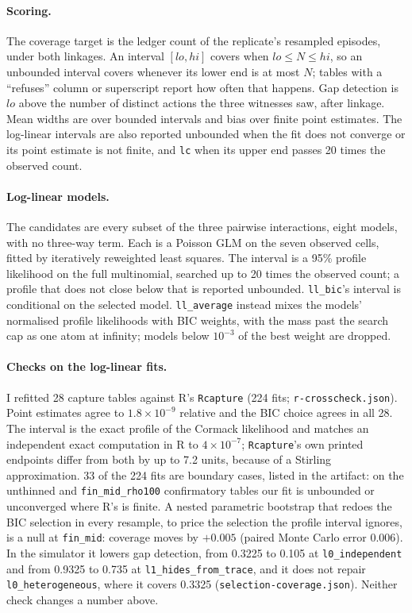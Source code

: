\documentclass[11pt]{article}
\begin{document}
\paragraph{Scoring.} The coverage target is the ledger count of the
replicate's resampled episodes, under both linkages. An interval $[lo, hi]$
covers when $lo \le N \le hi$, so an unbounded interval covers whenever its lower
end is at most $N$; tables with a ``refuses'' column or superscript report how
often that happens. Gap detection is
$lo$ above the number of distinct actions the three witnesses saw, after linkage.
Mean widths are over bounded intervals and bias over finite point estimates.
The log-linear intervals are also reported unbounded when the fit does not
converge or its point estimate is not finite, and \texttt{lc} when its upper end
passes 20 times the observed count.

\paragraph{Log-linear models.} The candidates are every subset of the three
pairwise interactions, eight models, with no three-way term. Each is a Poisson
GLM on the seven observed cells, fitted by iteratively reweighted least squares.
The interval is a 95\% profile likelihood on the full multinomial, searched up
to 20 times the observed count; a profile that does not close below that is
reported unbounded. \texttt{ll\_bic}'s interval is conditional on the selected
model. \texttt{ll\_average} instead mixes the models' normalised profile
likelihoods with BIC weights, with the mass past the search cap as one atom at
infinity; models below $10^{-3}$ of the best weight are dropped.

\paragraph{Checks on the log-linear fits.} I refitted 28 capture tables against R's
\texttt{Rcapture} (224 fits; \texttt{r-crosscheck.json}). Point estimates agree to
$1.8 \times 10^{-9}$ relative and the BIC choice agrees in all 28. The interval is
the exact profile of the Cormack likelihood and matches an independent exact
computation in R to $4 \times 10^{-7}$; \texttt{Rcapture}'s own printed endpoints
differ from both by up to 7.2 units, because of a Stirling approximation. 33 of the
224 fits are boundary cases, listed in the artifact: on the unthinned and
\texttt{fin\_mid\_rho100} confirmatory tables our fit is unbounded or unconverged
where R's is finite. A nested parametric bootstrap that redoes the BIC selection in
every resample, to price the selection the profile interval ignores, is a null at
\texttt{fin\_mid}: coverage moves by $+0.005$ (paired Monte Carlo error 0.006). In
the simulator it lowers gap detection, from 0.3225 to 0.105 at
\texttt{l0\_independent} and from 0.9325 to 0.735 at \texttt{l1\_hides\_from\_trace},
and it does not repair \texttt{l0\_heterogeneous}, where it covers 0.3325
(\texttt{selection-coverage.json}). Neither check changes a number above.
\end{document}
